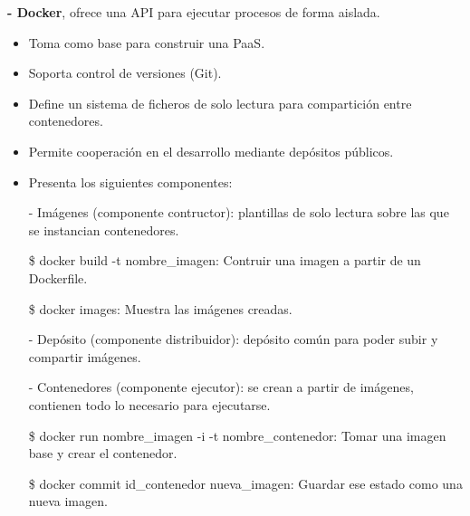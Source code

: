 \documentclass[12pt]{amsart}
\begin{document}
    {\bf - Docker}, ofrece una API para ejecutar procesos de forma aislada. 
    
    \begin{itemize}
    
    \item  Toma como base para construir una PaaS.
    
    \item  Soporta control de versiones (Git).
    
    \item  Define un sistema de ficheros de solo lectura para compartición entre contenedores.
    
    \item  Permite cooperación en el desarrollo mediante depósitos públicos.
    
    \item Presenta los siguientes componentes:
    
    \subitem - Imágenes (componente contructor): plantillas de solo lectura sobre las que se instancian contenedores.
    
    \$ docker build -t nombre\_imagen: Contruir una imagen a partir de un Dockerfile.
    
    \$ docker images: Muestra las imágenes creadas.
    
    \subitem - Depósito (componente distribuidor): depósito común para poder subir y compartir imágenes.
    
    \subitem - Contenedores (componente ejecutor): se crean a partir de imágenes, contienen todo lo necesario para ejecutarse.
    
    \$ docker run nombre\_imagen -i -t nombre\_contenedor: Tomar una imagen base y crear el contenedor.
    
    \$ docker commit id\_contenedor nueva\_imagen: Guardar ese estado como una nueva imagen.
    
    \end{itemize}
    
\end{document}
